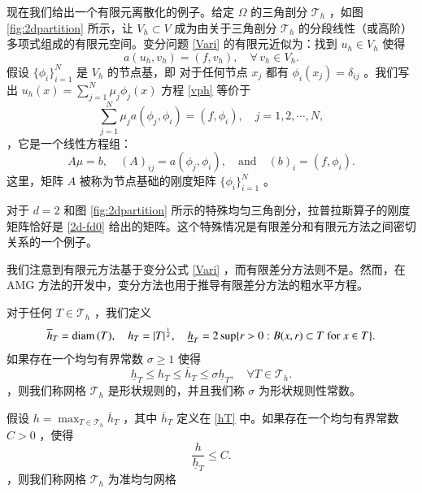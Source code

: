 \documentclass[12pt]{acta_2011xz}
\newcommand{\diam}{\mbox{\rm diam\,}}
\begin{document}
现在我们给出一个有限元离散化的例子。给定    $\Omega$    的三角剖分    ${\mathcal T}_h$   ，如图~    \ref{fig:2dpartition}    所示，让    $V_h\subset V$    成为由关于三角剖分    ${\mathcal T}_h$    的分段线性（或高阶）多项式组成的有限元空间。变分问题    \eqref{Vari}    的有限元近似为：找到    $u_h\in V_h$    使得
   \begin{equation}
  \label{vph}
a(u_h,  v_h)=(f,v_h), \quad\forall\,v_h\in V_h.
\end{equation}    假设    $ \{ \phi_i \} _{i=1}^{N}$    是    $V_h$    的节点基，即
对于任何节点    $x_j$    都有    $\phi_i(x_j)=\delta_{ij}$   。我们写出
   \(
        u_h(x)=\sum_{j=1}^{N}\mu_j\phi_j(x)
\)    方程    \eqref{vph}    等价于
   \[
        \sum_{j=1}^{N}\mu_ja(\phi_j,\phi_i)=(f,\phi_i),\quad
        j=1,2,\cdots, N, 
\]    ，它是一个线性方程组：
   \begin{equation}\label{axb}
        A\mu=b, \quad (A)_{ij} = a(\phi_j,\phi_i), \quad 
 \mbox{and}\quad (b)_i=(f,\phi_i).
\end{equation}    这里，矩阵    $A$    被称为节点基础的刚度矩阵
   $ \{ \phi_i   \} _{i=1}^N$    。  

对于    $d=2$    和图    \ref{fig:2dpartition}    所示的特殊均匀三角剖分，拉普拉斯算子的刚度矩阵恰好是    \eqref{2d-fd0}    给出的矩阵。这个特殊情况是有限差分和有限元方法之间密切关系的一个例子。  

我们注意到有限元方法基于变分公式    \eqref{Vari}    ，而有限差分方法则不是。然而，在 AMG 方法的开发中，变分方法也用于推导有限差分方法的粗水平方程。  

对于任何    $T\in \mathcal T_h$    ，我们定义
   \begin{equation}\label{hT}
        \overline h_T=\diam(T),\quad h_T=|T|^{\frac{1}{d}}, \quad \underline h_T=2\sup \{ r>0: B(x, r)\subset T \text{ for } x\in T \} .
    \end{equation}    如果存在一个均匀有界常数    $\sigma \ge 1$    使得 
   \begin{equation}
        \underline h_T\le h_T \le \overline h_T\le \sigma \underline h_T, \quad \forall T\in \mathcal T_h.
    \end{equation}    ，则我们称网格    $\mathcal T_h$    是形状规则的，并且我们称    $\sigma$    为形状规则性常数。  

假设    $h=\max_{T\in \mathcal T_h} \overline h_T$    ，其中    $\overline
    h_T$    定义在    \eqref{hT}    中。如果存在一个均匀有界常数
   $C > 0$    ，使得
   \begin{equation}
        \frac{h}{\underline h_T} \le C.
    \end{equation}    ，则我们称网格    $\mathcal T_h$    为准均匀网格  
\end{document}
